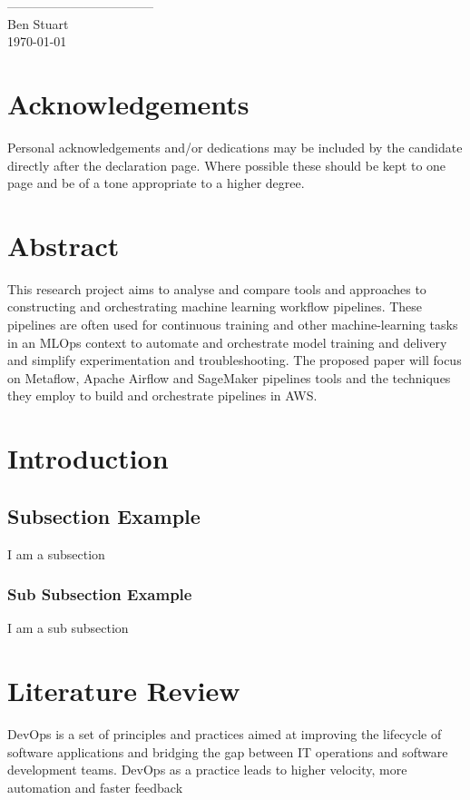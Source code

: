 \documentclass[12pt]{article}
\begin{document}
\vspace{2cm}
\begin{flushright}
-----------------------------------\\
Ben Stuart\\
\today
\end{flushright}
\pagebreak

\section*{Acknowledgements}
Personal acknowledgements and/or dedications may be included by the candidate directly after the declaration page. Where possible these should be kept to one page and be of a tone appropriate to a higher degree.
\pagebreak

\listoffigures
\pagebreak
 
\listoftables
\pagebreak


\tableofcontents
\pagebreak

\section*{Abstract}
This research project aims to analyse and compare tools and approaches to constructing and orchestrating machine learning workflow pipelines. These pipelines are often used for continuous training and other machine-learning tasks in an MLOps context to automate and orchestrate model training and delivery and simplify experimentation and troubleshooting. The proposed paper will focus on Metaflow, Apache Airflow and SageMaker pipelines tools and the techniques they employ to build and orchestrate pipelines in AWS.
\pagebreak

\section{Introduction}
\subsection{Subsection Example}
I am a subsection
\subsubsection{Sub Subsection Example}
I am a sub subsection
\pagebreak

\section{Literature Review}
DevOps is a set of principles and practices aimed at improving the lifecycle of software applications and bridging the gap between IT operations and software development teams. DevOps as a practice leads to higher velocity, more automation and faster feedback \citep{kimPhoenixProjectNovel2018, kimDevOpsHandbookHow2016, humbleContinuousDeliveryReliable2010, kreuzbergerMachineLearningOperations2022}
\end{document}
